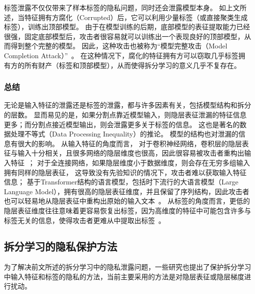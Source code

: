 标签泄露不仅仅带来了样本标签的隐私问题，同时还会泄露模型本身。
%
如上文所述，当特征拥有方腐化（Corrupted）后，它可以利用少量标签（或直接聚类生成标签），训练出顶部模型。
%
由于在模型训练的后期，底部模型的表征提取能力已经很强，固定底部模型后，攻击者很容易就可以训练出一个表现良好的顶部模型，从而得到整个完整的模型。
%
因此，这种攻击也被称为``模型完整攻击（Model Completion Attack）''~\cite{fucong2022label_infer_attack}。
%
在这种情况下，腐化的特征拥有方可以窃取几乎标签拥有方的所有财产（标签和顶部模型），从而使得拆分学习的意义几乎不复存在。


\subsubsection{总结}

无论是输入特征的泄露还是标签的泄露，都与许多因素有关，包括模型结构和拆分的层数。
%
显而易见的是，如果分割点靠近模型输入，则隐层表征泄漏的特征信息更多；而分割点接近模型输出，则会泄露更多关于标签的信息。
%
这也是著名的数据处理不等式（Data Processing Inequality）的推论。
%
模型的结构也对泄漏的信息有很大的影响。
%
从输入特征的角度而言，
%
对于卷积神经网络，卷积层的隐层表征与输入十分相关，且很多网络的隐层维度也很高，因此很容易被攻击者重构出输入特征~\cite{abuadbba2020can_split}；
%
对于全连接网络，如果隐层维度小于数据维度，则会存在无穷多组输入拥有同样的隐层表征，
这导致没有先验知识的情况下，攻击者难以获取输入特征信息；
%
基于Transformer结构的语言模型，包括时下流行的大语言模型（Large Language Model），拥有很高的隐层表征维度，并且保留了序列结构，因此攻击者也可以轻易地从隐层表征中重构出原始的输入文本~\cite{morris2023embedding_almost}。
%
从标签的角度而言，更低的隐层表征维度往往意味着更容易恢复出标签，因为高维度的特征中可能包含许多与标签无关的信息，使得攻击者更难从中提取出标签~\cite{oscarli2022label_defense_marvell,sunjiankai2022forward_embedding_protect}。


\subsection{拆分学习的隐私保护方法}
为了解决前文所述的拆分学习中的隐私泄露问题，一些研究也提出了保护拆分学习中输入特征和标签的隐私的方法，当前主要采用的方法是对隐层表征或隐层梯度进行扰动。

